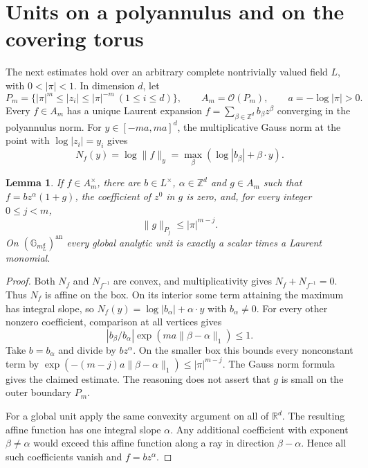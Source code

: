 \documentclass[11pt]{article}
\newtheorem{lemma}[theorem]{Lemma}
\theoremstyle{remark}\newtheorem{remark}[theorem]{Remark}
\newcommand{\an}{\mathrm{an}}
\newcommand{\Gm}{\mathbb G_m}
\newcommand{\Z}{\mathbb Z}
\newcommand{\R}{\mathbb R}
\newcommand{\OO}{\mathcal O}
\begin{document}
\section{Units on a polyannulus and on the covering torus}\label{units}
The next estimates hold over an arbitrary complete nontrivially valued
field $L$, with $0<|\pi|<1$. In dimension $d$, let
\[
 P_m=\{ |\pi|^m\le |z_i|\le |\pi|^{-m}\ (1\le i\le d)\},
 \qquad A_m=\OO(P_m),\qquad a=-\log|\pi|>0.
\]
Every $f\in A_m$ has a unique Laurent expansion
$f=\sum_{\beta\in\Z^d}b_\beta z^\beta$ converging in the polyannulus norm.
For $y\in[-ma,ma]^d$, the multiplicative Gauss norm at the point with
$\log|z_i|=y_i$ gives
\[
 N_f(y)=\log\|f\|_y
       =\max_\beta(\log|b_\beta|+\beta\cdot y).
\]

\begin{lemma}\label{unitestimate}
If $f\in A_m^\times$, there are $b\in L^\times$, $\alpha\in\Z^d$ and
$g\in A_m$ such that $f=bz^\alpha(1+g)$, the coefficient of $z^0$
in $g$ is zero, and, for every integer $0\le j<m$,
\[
 \|g\|_{P_j}\le |\pi|^{m-j}.
\]
On $(\Gm_L^d)^{\an}$ every global analytic unit is exactly a scalar
times a Laurent monomial.
\end{lemma}
\begin{proof}
Both $N_f$ and $N_{f^{-1}}$ are convex, and multiplicativity gives
$N_f+N_{f^{-1}}=0$. Thus $N_f$ is affine on the box. On its interior
some term attaining the maximum has integral slope, so
$N_f(y)=\log|b_\alpha|+\alpha\cdot y$ with $b_\alpha\ne0$.
For every other nonzero coefficient, comparison at all vertices gives
\[
 |b_\beta/b_\alpha|\exp(ma\|\beta-\alpha\|_1)\le1.
\]
Take $b=b_\alpha$ and divide by $bz^\alpha$. On the smaller box this
bounds every nonconstant term by
$\exp(-(m-j)a\|\beta-\alpha\|_1)\le|\pi|^{m-j}$. The Gauss norm
formula gives the claimed estimate. The reasoning does not assert that
$g$ is small on the outer boundary $P_m$.

For a global unit apply the same convexity argument on all of $\R^d$.
The resulting affine function has one integral slope $\alpha$.
Any additional coefficient with exponent $\beta\ne\alpha$ would exceed
this affine function along a ray in direction $\beta-\alpha$.
Hence all such coefficients vanish and $f=bz^\alpha$.
\end{proof}
\end{document}
